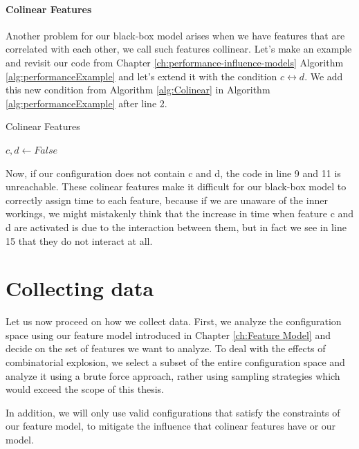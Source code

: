 \paragraph{Colinear Features}
Another problem for our black-box model arises when we have features that are correlated with each other, we call such features collinear.
Let's make an example and revisit our code from Chapter \ref{ch:performance-influence-models} Algorithm \ref{alg:performanceExample} and let's
 extend it with the condition $c \leftrightarrow d$. We add this new condition from Algorithm \ref{alg:Colinear} in Algorithm 
\ref{alg:performanceExample} after line 2.

\begin{algorithm}
    \caption{Colinear Features \label{alg:Colinear}}
    \begin{algorithmic}[1]

        \State $c,d \gets False$
    \EndIf

    \end{algorithmic}
    \end{algorithm}

Now, if our configuration does not contain c and d, the code in line 9 and 11 is unreachable. These colinear features make it difficult 
for our black-box model to correctly assign time to each feature, because if we are unaware of the inner workings, we might mistakenly think
that the increase in time when feature c and d are activated is due to the interaction between them, but in fact we see in line
15 that they do not interact at all. %

\section{Collecting data}

Let us now proceed on how we collect data. First, we analyze the configuration space using our feature model introduced in Chapter \ref{ch:Feature Model}
and decide on the set of features we want to analyze. To deal with the effects of combinatorial explosion, we select a subset of the entire
configuration space and analyze it using a brute force approach, rather using sampling strategies which would exceed the scope of this
thesis.

In addition, we will only use valid configurations that satisfy the constraints of our feature model, to mitigate
the influence that colinear features have or our model.


